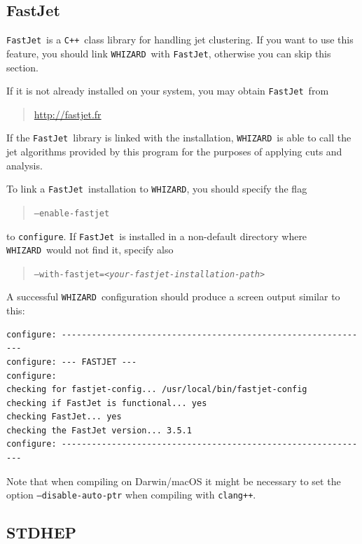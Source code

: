 \documentclass[12pt]{book}
\newcommand{\ttt}[1]{\texttt{#1}}
\newcommand{\whizard}{\ttt{WHIZARD}}
\newcommand{\fastjet}{\ttt{FastJet}}
\newcommand{\cpp}{\ttt{C++}}
\begin{document}

\subsection{FastJet}
\label{sec:fastjet}

\fastjet\ is a \cpp\ class library for handling jet clustering.
If you want to use this feature, you should link \whizard\ with \fastjet,
otherwise you can skip this section.

If it is not already installed on your system, you may obtain
\fastjet\ from
\begin{quote}
  \url{http://fastjet.fr}
\end{quote}
If the \fastjet\ library is linked with the installation, \whizard\ is
able to call the jet algorithms provided by this program for the purposes of
applying cuts and analysis.

To link a \fastjet\ installation to \whizard, you should specify the flag
\begin{quote}
\ttt{--enable-fastjet}
\end{quote}
to \ttt{configure}.  If  \fastjet\ is installed in a non-default directory
where \whizard\ would not find it, specify also
\begin{quote}
\ttt{--with-fastjet=\emph{<your-fastjet-installation-path>}}
\end{quote}

A successful \whizard\ configuration should produce a screen output
similar to this:
\begin{footnotesize}
\begin{verbatim}
configure: --------------------------------------------------------------
configure: --- FASTJET ---
configure:
checking for fastjet-config... /usr/local/bin/fastjet-config
checking if FastJet is functional... yes
checking FastJet... yes
checking the FastJet version... 3.5.1
configure: --------------------------------------------------------------
\end{verbatim}
\end{footnotesize}

Note that when compiling on Darwin/macOS it might be necessary to
set the option \ttt{--disable-auto-ptr} when compiling with
\ttt{clang++}.


\subsection{STDHEP}
\label{sec:stdhep}
\end{document}
